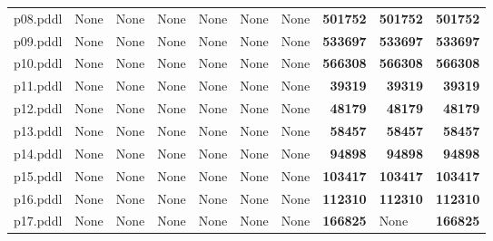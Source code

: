 \documentclass{article}
\begin{document}
\begin{tabular}{@{}lrrrrrrrrr@{}}
p08.pddl & \multicolumn{1}{|l|}{None} & \multicolumn{1}{|l|}{None} & \multicolumn{1}{|l|}{None} & \multicolumn{1}{|l|}{None} & \multicolumn{1}{|l|}{None} & \multicolumn{1}{|l|}{None} & \textbf{501752} & \textbf{501752} & \textbf{501752} \\
p09.pddl & \multicolumn{1}{|l|}{None} & \multicolumn{1}{|l|}{None} & \multicolumn{1}{|l|}{None} & \multicolumn{1}{|l|}{None} & \multicolumn{1}{|l|}{None} & \multicolumn{1}{|l|}{None} & \textbf{533697} & \textbf{533697} & \textbf{533697} \\
p10.pddl & \multicolumn{1}{|l|}{None} & \multicolumn{1}{|l|}{None} & \multicolumn{1}{|l|}{None} & \multicolumn{1}{|l|}{None} & \multicolumn{1}{|l|}{None} & \multicolumn{1}{|l|}{None} & \textbf{566308} & \textbf{566308} & \textbf{566308} \\
p11.pddl & \multicolumn{1}{|l|}{None} & \multicolumn{1}{|l|}{None} & \multicolumn{1}{|l|}{None} & \multicolumn{1}{|l|}{None} & \multicolumn{1}{|l|}{None} & \multicolumn{1}{|l|}{None} & \textbf{39319} & \textbf{39319} & \textbf{39319} \\
p12.pddl & \multicolumn{1}{|l|}{None} & \multicolumn{1}{|l|}{None} & \multicolumn{1}{|l|}{None} & \multicolumn{1}{|l|}{None} & \multicolumn{1}{|l|}{None} & \multicolumn{1}{|l|}{None} & \textbf{48179} & \textbf{48179} & \textbf{48179} \\
p13.pddl & \multicolumn{1}{|l|}{None} & \multicolumn{1}{|l|}{None} & \multicolumn{1}{|l|}{None} & \multicolumn{1}{|l|}{None} & \multicolumn{1}{|l|}{None} & \multicolumn{1}{|l|}{None} & \textbf{58457} & \textbf{58457} & \textbf{58457} \\
p14.pddl & \multicolumn{1}{|l|}{None} & \multicolumn{1}{|l|}{None} & \multicolumn{1}{|l|}{None} & \multicolumn{1}{|l|}{None} & \multicolumn{1}{|l|}{None} & \multicolumn{1}{|l|}{None} & \textbf{94898} & \textbf{94898} & \textbf{94898} \\
p15.pddl & \multicolumn{1}{|l|}{None} & \multicolumn{1}{|l|}{None} & \multicolumn{1}{|l|}{None} & \multicolumn{1}{|l|}{None} & \multicolumn{1}{|l|}{None} & \multicolumn{1}{|l|}{None} & \textbf{103417} & \textbf{103417} & \textbf{103417} \\
p16.pddl & \multicolumn{1}{|l|}{None} & \multicolumn{1}{|l|}{None} & \multicolumn{1}{|l|}{None} & \multicolumn{1}{|l|}{None} & \multicolumn{1}{|l|}{None} & \multicolumn{1}{|l|}{None} & \textbf{112310} & \textbf{112310} & \textbf{112310} \\
p17.pddl & \multicolumn{1}{|l|}{None} & \multicolumn{1}{|l|}{None} & \multicolumn{1}{|l|}{None} & \multicolumn{1}{|l|}{None} & \multicolumn{1}{|l|}{None} & \multicolumn{1}{|l|}{None} & \textbf{166825} & \multicolumn{1}{|l|}{None} & \textbf{166825} \\

\end{tabular}
\end{document}
